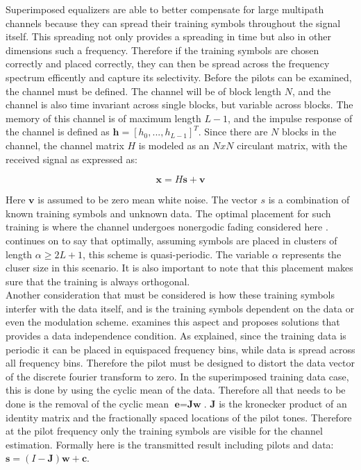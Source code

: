 Superimposed equalizers are able to better compensate for large multipath channels because they can spread their training symbols throughout the signal itself.  This spreading not only provides a spreading in time but also in other dimensions such a frequency.  Therefore if the training symbols are chosen correctly and placed correctly, they can then be spread across the frequency spectrum efficently and capture its selectivity.  Before the pilots can be examined, the channel must be defined.  The channel will be of block length \(N\), and the channel is also time invariant across single blocks, but variable across blocks.  The memory of this channel is of maximum length \(L-1\), and the impulse response of the channel is defined as \(\textbf{h}=[h_{0},...,h_{L-1}]^{T}\).  Since there are \(N\) blocks in the channel, the channel matrix \(H\) is modeled as an \(N x N\) circulant matrix, with the received signal as expressed as:

\[ \textbf{x}=\textit{H}\textbf{s}+\textbf{v}  \]

Here \(\textbf{v}\) is assumed to be zero mean white noise.  The vector \(s\) is a combination of known training symbols and unknown data.  The optimal placement for such training is where the channel undergoes nonergodic fading considered here \cite{20}.  \cite{16} continues on to say that optimally, assuming symbols are placed in clusters of length \(\alpha \ge 2L+1\), this scheme is quasi-periodic.  The variable \(\alpha\) represents the cluser size in this scenario.  It is also important to note that this placement makes sure that the training is always orthogonal.\\

Another consideration that must be considered is how these training symbols interfer with the data itself, and is the training symbols dependent on the data or even the modulation scheme.\cite{Ghogho} examines this aspect and proposes solutions that provides a data independence condition.  As explained, since the training data is periodic it can be placed in equispaced frequency bins, while data is spread across all frequency bins.   Therefore the pilot must be designed to distort the data vector of the discrete fourier transform to zero.  In the superimposed training data case, this is done by using the cyclic mean of the data.  Therefore all that needs to be done is the removal of the cyclic mean \(\textbf{e}=\textbf{Jw}\).  \(\textbf{J}\) is the kronecker product of an identity matrix and the fractionally spaced locations of the pilot tones.  Therefore at the pilot frequency only the training symbols are visible for the channel estimation.  Formally here is the transmitted result including pilots and data: \( \textbf{s}= (I-\textbf{J})\textbf{w}+\textbf{c}  \).\\



